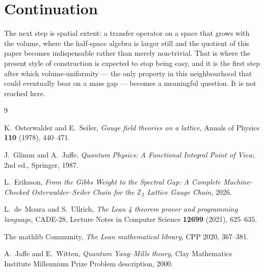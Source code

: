 \documentclass[11pt]{article}
\theoremstyle{definition}
\newcommand{\Z}{\mathbb{Z}}
\begin{document}
\section{Continuation}

The next step is spatial extent: a transfer operator on a space that grows with
the volume, where the half-space algebra is larger still and the quotient of
this paper becomes indispensable rather than merely non-trivial.  That is where
the present style of construction is expected to stop being easy, and it is the
first step after which volume-uniformity --- the only property in this
neighbourhood that could eventually bear on a mass gap --- becomes a meaningful
question.  It is not reached here.

\begin{thebibliography}{9}

K.~Osterwalder and E.~Seiler,
\emph{Gauge field theories on a lattice},
Annals of Physics \textbf{110} (1978), 440--471.

J.~Glimm and A.~Jaffe,
\emph{Quantum Physics: A Functional Integral Point of View},
2nd ed., Springer, 1987.

L.~Eriksson,
\emph{From the Gibbs Weight to the Spectral Gap: A Complete Machine-Checked
Osterwalder--Seiler Chain for the $\Z_2$ Lattice Gauge Chain}, 2026.

L.~de~Moura and S.~Ullrich,
\emph{The Lean 4 theorem prover and programming language},
CADE-28, Lecture Notes in Computer Science \textbf{12699} (2021), 625--635.

The mathlib Community,
\emph{The Lean mathematical library},
CPP 2020, 367--381.

A.~Jaffe and E.~Witten,
\emph{Quantum Yang--Mills theory},
Clay Mathematics Institute Millennium Prize Problem description, 2000.

\end{thebibliography}
\end{document}
